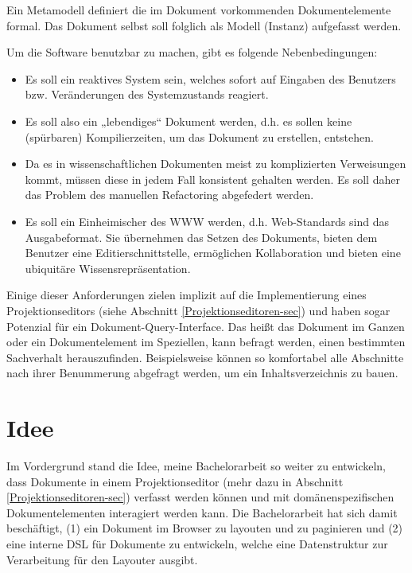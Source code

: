  
Ein Metamodell definiert die im Dokument vorkommenden Dokumentelemente formal. Das Dokument selbst soll folglich als Modell (Instanz) aufgefasst werden.

 
Um die Software benutzbar zu machen, gibt es folgende Nebenbedingungen:

 
\begin{itemize}

\item Es soll ein reaktives System sein, welches sofort auf Eingaben des Benutzers bzw. Veränderungen des Systemzustands reagiert.
\item Es soll also ein „lebendiges“ Dokument werden, d.h. es sollen keine (spürbaren) Kompilierzeiten, um das Dokument zu erstellen, entstehen.
\item Da es in wissenschaftlichen Dokumenten meist zu komplizierten Verweisungen kommt, müssen diese in jedem Fall konsistent gehalten werden. Es soll daher das Problem des manuellen Refactoring abgefedert werden.
\item Es soll ein Einheimischer des WWW werden, d.h. Web-Standards sind das Ausgabeformat. Sie übernehmen das Setzen des Dokuments, bieten dem Benutzer eine Editierschnittstelle, ermöglichen Kollaboration und bieten eine ubiquitäre Wissensrepräsentation.
\end{itemize}
 
Einige dieser Anforderungen zielen implizit auf die Implementierung eines Projektionseditors (siehe Abschnitt \ref{Projektionseditoren-sec}) und haben sogar Potenzial für ein Dokument-Query-Interface. Das heißt das Dokument im Ganzen oder ein Dokumentelement im Speziellen, kann befragt werden, einen bestimmten Sachverhalt herauszufinden. Beispielsweise können so komfortabel alle Abschnitte nach ihrer Benummerung abgefragt werden, um ein Inhaltsverzeichnis zu bauen.

 
\section{Idee}\label{}
 
Im Vordergrund stand die Idee, meine Bachelorarbeit \citep{Hodapp} so weiter zu entwickeln, dass Dokumente in einem Projektionseditor (mehr dazu in Abschnitt \ref{Projektionseditoren-sec}) verfasst werden können und mit domänenspezifischen Dokumentelementen interagiert werden kann. Die Bachelorarbeit hat sich damit beschäftigt, (1) ein Dokument im Browser zu layouten und zu paginieren und (2) eine interne DSL für Dokumente zu entwickeln, welche eine Datenstruktur zur Verarbeitung für den Layouter ausgibt.

